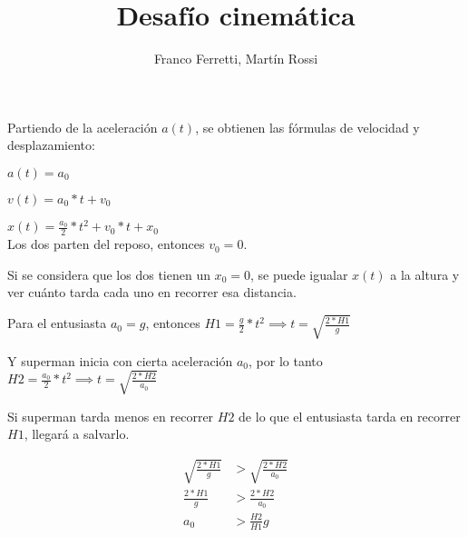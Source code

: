 \documentclass[12pt]{article}
\title{\LARGE \textbf{Desafío cinemática}}
\author{Franco Ferretti, Martín Rossi}
\date{}
\begin{document}
\maketitle
Partiendo de la aceleración $a(t)$, se obtienen las fórmulas de velocidad y desplazamiento:

$a(t)=a_0$

$v(t)=a_0*t+v_0$

$x(t)=\frac{a_0}{2}*t^2+v_0*t+x_0$\\

Los dos parten del reposo, entonces $v_0=0$.

Si se considera que los dos tienen un $x_0=0$, se puede igualar $x(t)$ a la altura y ver cuánto tarda cada uno en recorrer esa distancia.

Para el entusiasta $a_0=g$, entonces $H1=\frac{g}{2}*t^2\implies t=\sqrt{\frac{2*H1}{g}}$

Y superman inicia con cierta aceleración $a_0$, por lo tanto $H2=\frac{a_0}{2}*t^2\implies t=\sqrt{\frac{2*H2}{a_0}}$

Si superman tarda menos en recorrer $H2$ de lo que el entusiasta tarda en recorrer $H1$, llegará a salvarlo.

\begin{align*}
  \sqrt{\frac{2*H1}{g}}&>\sqrt{\frac{2*H2}{a_0}}\\
  \frac{2*H1}{g}&>\frac{2*H2}{a_0}\\
  a_0&>\frac{H2}{H1}g
\end{align*}
\end{document}
